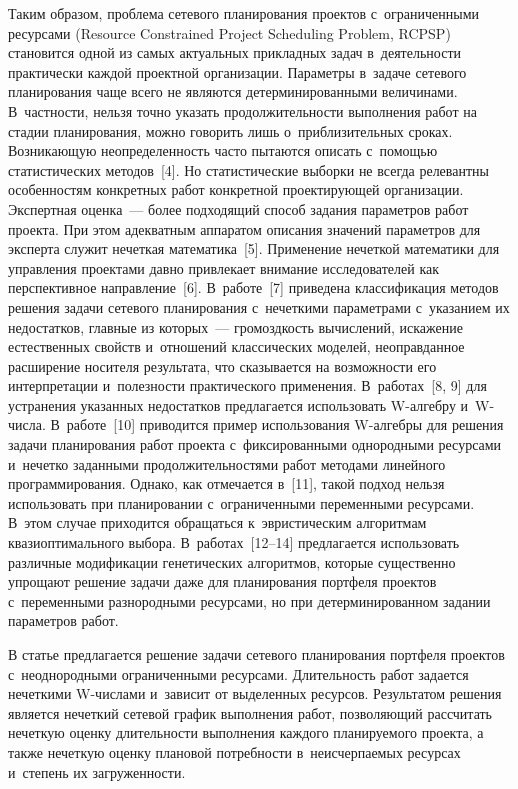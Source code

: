 \begin{multicols}{2}
  Таким образом, проблема сетевого планирования проектов с~ограниченными 
ресурсами (Resource Constrained Project Scheduling Problem, \mbox{RCPSP}) становится 
одной из самых актуальных прикладных задач в~деятельности практически 
каж\-дой проектной организации. Параметры в~задаче сетевого планирования 
чаще всего не являются детерминированными величинами. В~част\-ности, 
нельзя точно указать продолжительности выполнения работ на стадии 
планирования, можно говорить лишь о~приблизительных сроках. 
Воз\-ни\-ка\-ющую неопределенность часто пытаются описать с~по\-мощью 
статистических методов~[4]. Но статистические выборки не всегда релевантны 
особенностям конкретных работ конкретной проектирующей организации. 
Экспертная оценка~--- более подходящий способ задания параметров работ 
проекта. При этом адекватным аппаратом описания значений параметров для 
эксперта служит нечеткая математика~[5]. Применение нечеткой математики 
для управления проектами давно привлекает внимание исследователей как 
перспективное на\-прав\-ле\-ние~[6]. В~работе~[7] приведена классификация 
методов решения задачи сетевого планирования с~нечеткими параметрами 
с~указанием их недостатков, главные из которых~--- громоздкость вычислений, 
искажение естественных свойств и~отношений классических моделей, 
неоправданное расширение носителя результата, что сказывается на 
возможности его интерпретации и~полезности практического применения. 
В~работах~[8, 9] для устранения указанных недостатков предлагается 
использовать W-ал\-геб\-ру и~W-чис\-ла. В~работе~[10] приводится пример 
использования W-ал\-геб\-ры для решения задачи планирования работ проекта 
с~фиксированными однородными ресурсами и~нечетко заданными 
продолжительностями работ методами линейного программирования. Однако, 
как отмечается в~[11], такой подход нельзя использовать при планировании 
с~ограниченными переменными ресурсами. В~этом случае приходится 
обращаться к~эвристическим алгоритмам квазиоптимального выбора. 
В~работах~[12--14] предлагается использовать различные модификации 
генетических алгоритмов, которые существенно упрощают решение задачи 
даже для планирования портфеля проектов с~переменными разнородными 
ресурсами, но при детерминированном задании параметров работ.
  
  В статье предлагается решение задачи сетевого планирования портфеля 
проектов с~неоднородными ограниченными ресурсами. Длительность работ 
задается нечеткими W-чис\-ла\-ми и~зависит от выделенных ресурсов. 
Результатом решения является нечеткий сетевой график выполнения работ, 
позволяющий рассчитать нечеткую оценку длительности выполнения каждого 
планируемого проекта, а также нечеткую оценку плановой потребности 
в~неисчерпаемых ресурсах и~степень их загруженности.
  

\end{multicols}
